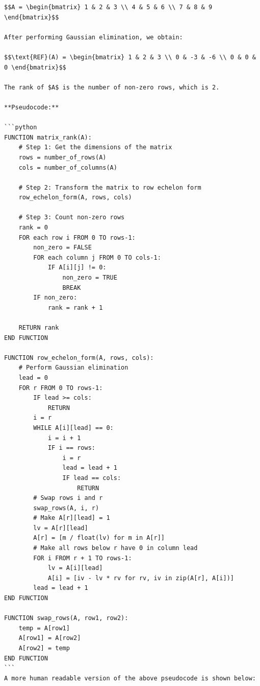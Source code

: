 \documentclass[
  letterpaper,
  DIV=11,
  numbers=noendperiod]{scrreprt}
\theoremstyle{plain}
\theoremstyle{definition}
\theoremstyle{remark}
\begin{document}
\begin{verbatim}
$$A = \begin{bmatrix} 1 & 2 & 3 \\ 4 & 5 & 6 \\ 7 & 8 & 9 \end{bmatrix}$$

After performing Gaussian elimination, we obtain:

$$\text{REF}(A) = \begin{bmatrix} 1 & 2 & 3 \\ 0 & -3 & -6 \\ 0 & 0 & 0 \end{bmatrix}$$

The rank of $A$ is the number of non-zero rows, which is 2.

**Pseudocode:**

```python
FUNCTION matrix_rank(A):
    # Step 1: Get the dimensions of the matrix
    rows = number_of_rows(A)
    cols = number_of_columns(A)
    
    # Step 2: Transform the matrix to row echelon form
    row_echelon_form(A, rows, cols)
    
    # Step 3: Count non-zero rows
    rank = 0
    FOR each row i FROM 0 TO rows-1:
        non_zero = FALSE
        FOR each column j FROM 0 TO cols-1:
            IF A[i][j] != 0:
                non_zero = TRUE
                BREAK
        IF non_zero:
            rank = rank + 1
    
    RETURN rank
END FUNCTION

FUNCTION row_echelon_form(A, rows, cols):
    # Perform Gaussian elimination
    lead = 0
    FOR r FROM 0 TO rows-1:
        IF lead >= cols:
            RETURN
        i = r
        WHILE A[i][lead] == 0:
            i = i + 1
            IF i == rows:
                i = r
                lead = lead + 1
                IF lead == cols:
                    RETURN
        # Swap rows i and r
        swap_rows(A, i, r)
        # Make A[r][lead] = 1
        lv = A[r][lead]
        A[r] = [m / float(lv) for m in A[r]]
        # Make all rows below r have 0 in column lead
        FOR i FROM r + 1 TO rows-1:
            lv = A[i][lead]
            A[i] = [iv - lv * rv for rv, iv in zip(A[r], A[i])]
        lead = lead + 1
END FUNCTION

FUNCTION swap_rows(A, row1, row2):
    temp = A[row1]
    A[row1] = A[row2]
    A[row2] = temp
END FUNCTION
```
A more human readable version of the above pseudocode is shown below:


\end{verbatim}
\end{document}

